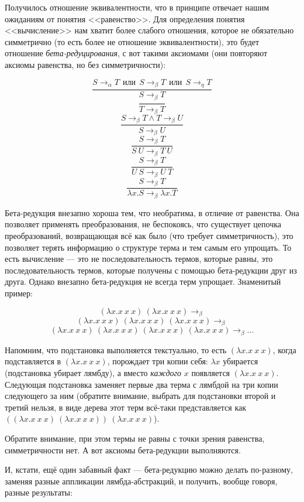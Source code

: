 \documentclass[a5paper]{article}
\begin{document}
Получилось отношение эквивалентности, что в принципе отвечает нашим ожиданиям от понятия <<равенство>>. Для определения понятия <<вычисление>> нам хватит более слабого отношения, которое не обязательно симметрично (то есть более не отношение эквивалентности), это будет отношение \textit{бета-редуцирования}, с вот такими аксиомами (они повторяют аксиомы равенства, но без симметричности):

$$\dfrac{S \rightarrow_\alpha T\ \ 
\mbox{или}\ \ S \rightarrow_\beta T\ \ 
\mbox{или}\ \  S \rightarrow_\eta T}{S \rightarrow_\beta T}$$ 
$$\dfrac{}{T \rightarrow_\beta T}$$
$$\dfrac{S \rightarrow_\beta T \wedge T \rightarrow_\beta U}{S \rightarrow_\beta U}$$
$$\dfrac{S \rightarrow_\beta T}{S\ U \rightarrow_\beta T\ U}$$
$$\dfrac{S \rightarrow_\beta T}{U\ S \rightarrow_\beta U\ T}$$
$$\dfrac{S \rightarrow_\beta T}{\lambda x.S \rightarrow_\beta \lambda x.T}$$

Бета-редукция внезапно хороша тем, что необратима, в отличие от равенства. Она позволяет применять преобразования, не беспокоясь, что существует цепочка преобразований, возвращающая всё как было (что требует симметричность), это позволяет терять информацию о структуре терма и тем самым его упрощать. То есть вычисление --- это не последовательность термов, которые равны, это последовательность термов, которые получены с помощью бета-редукции друг из друга. Однако внезапно бета-редукция не всегда терм упрощает. Знаменитый пример:

$$(\lambda x.x\ x\ x)\ (\lambda x.x\ x\ x) \rightarrow_\beta$$ 
$$(\lambda x.x\ x\ x)\ (\lambda x.x\ x\ x)\ (\lambda x.x\ x\ x) \rightarrow_\beta$$
$$(\lambda x.x\ x\ x)\ (\lambda x.x\ x\ x)\ (\lambda x.x\ x\ x)\ (\lambda x.x\ x\ x) \rightarrow_\beta ...$$

Напомним, что подстановка выполняется текстуально, то есть $(\lambda x.x\ x\ x)$, когда подставляется в $(\lambda x.x\ x\ x)$, порождает три копии себя:  $\lambda x$ убирается (подстановка убирает лямбду), а вместо \textit{каждого} $x$ появляется $(\lambda x.x\ x\ x)$. Следующая подстановка заменяет первые два терма с лямбдой на три копии следующего за ним (обратите внимание, выбрать для подстановки второй и третий нельзя, в виде дерева этот терм всё-таки представляется как $((\lambda x.x\ x\ x)\ (\lambda x.x\ x\ x))\ (\lambda x.x\ x\ x)$).

Обратите внимание, при этом термы не равны с точки зрения равенства, симметричности нет. А вот аксиомы бета-редукции выполняются. 

И, кстати, ещё один забавный факт --- бета-редукцию можно делать по-разному, заменяя разные аппликации лямбда-абстракций, и получить, вообще говоря, разные результаты:
\end{document}
